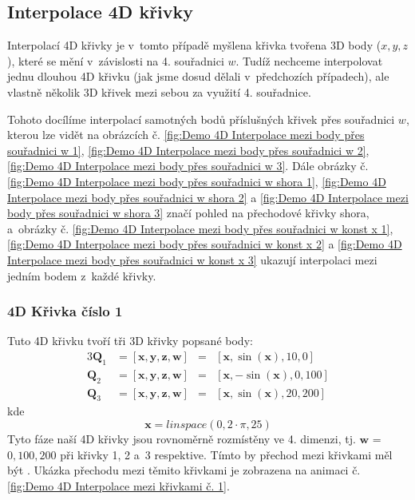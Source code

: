 \subsection{Interpolace 4D křivky}
Interpolací 4D křivky je v~tomto případě myšlena křivka tvořena 3D body ($x, y,
    z$), které se mění v~závislosti na 4. souřadnici $w$. Tudíž nechceme
interpolovat jednu dlouhou 4D křivku (jak jsme dosud dělali v~předchozích
případech), ale vlastně několik 3D křivek mezi sebou za využití 4.
souřadnice.\par Tohoto docílíme interpolací samotných bodů příslušných křivek
přes souřadnici $w$, kterou lze vidět na obrázcích č. \ref{fig:Demo 4D
    Interpolace mezi body přes souřadnici w 1}, \ref{fig:Demo 4D Interpolace mezi
    body přes souřadnici w 2}, \ref{fig:Demo 4D Interpolace mezi body přes
    souřadnici w 3}. Dále obrázky č. \ref{fig:Demo 4D Interpolace mezi body přes
    souřadnici w shora 1}, \ref{fig:Demo 4D Interpolace mezi body přes souřadnici w
    shora 2} a \ref{fig:Demo 4D Interpolace mezi body přes souřadnici w shora 3}
značí pohled na přechodové křivky shora, a~obrázky č. \ref{fig:Demo 4D
    Interpolace mezi body přes souřadnici w konst x 1}, \ref{fig:Demo 4D
    Interpolace mezi body přes souřadnici w konst x 2} a \ref{fig:Demo 4D
    Interpolace mezi body přes souřadnici w konst x 3} ukazují interpolaci mezi
jedním bodem z~každé křivky.

\subsubsection{4D Křivka číslo 1}
Tuto 4D křivku tvoří tři 3D křivky popsané body:
\begin{alignat}{3}
    \bm{Q}_1 & = [\bm{x}, \bm{y}, \bm{z}, \bm{w}] & = & [\bm{x}, \sin(\bm{x}), 10, 0]   \\
    \bm{Q}_2 & = [\bm{x}, \bm{y}, \bm{z}, \bm{w}] & = & [\bm{x}, -\sin(\bm{x}), 0, 100] \\
    \bm{Q}_3 & = [\bm{x}, \bm{y}, \bm{z}, \bm{w}] & = & [\bm{x}, \sin(\bm{x}), 20, 200]
\end{alignat}
kde
\begin{equation}
    \bm{x} = linspace(0, 2\cdot\pi, 25)
\end{equation}
Tyto fáze naší 4D křivky jsou rovnoměrně rozmístěny ve 4. dimenzi, tj.
$\bm{w}$ = $0, 100, 200$ při křivky 1, 2 a~3 respektive. Tímto by přechod mezi křivkami měl
být . Ukázka přechodu mezi těmito křivkami je
zobrazena na animaci č. \ref{fig:Demo 4D Interpolace mezi křivkami č. 1}.
